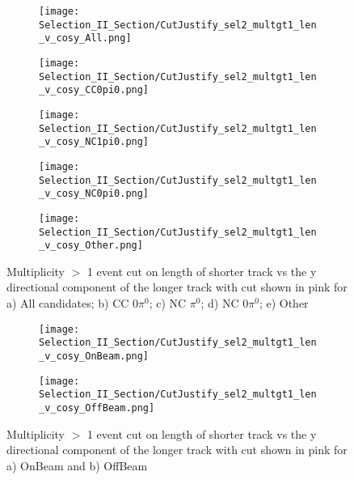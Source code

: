 \begin{figure}[H]
\centering
  \begin{subfigure}[t]{0.36\textwidth}
    \centering
\texttt{[image: Selection\_II\_Section/CutJustify\_sel2\_multgt1\_len\_v\_cosy\_All.png]}
  \caption{ }
  \end{subfigure} 
  \hspace{10 mm}
  \begin{subfigure}[t]{0.36\textwidth}
    \centering
\texttt{[image: Selection\_II\_Section/CutJustify\_sel2\_multgt1\_len\_v\_cosy\_CC0pi0.png]}
  \caption{ }
  \end{subfigure} 
  \hspace{5 mm}
  \begin{subfigure}[t]{0.36\textwidth}
    \centering
\texttt{[image: Selection\_II\_Section/CutJustify\_sel2\_multgt1\_len\_v\_cosy\_NC1pi0.png]}
  \caption{ }
  \end{subfigure} 
  \hspace{10 mm}
  \begin{subfigure}[t]{0.36\textwidth}
    \centering
\texttt{[image: Selection\_II\_Section/CutJustify\_sel2\_multgt1\_len\_v\_cosy\_NC0pi0.png]}  \caption{ }
  \end{subfigure} 
  \hspace{5 mm}
  \begin{subfigure}[t]{0.36\textwidth}
    \centering
\texttt{[image: Selection\_II\_Section/CutJustify\_sel2\_multgt1\_len\_v\_cosy\_Other.png]}
 \caption{ }
  \end{subfigure} 
\caption{ Multiplicity $>$ 1 event cut on length of shorter track vs the y directional component of the longer track with cut shown in pink for a) All candidates; b) CC 0$\pi^0$; c) NC $\pi^0$; d) NC 0$\pi^0$; e) Other }
\label{fig:cutjust_sel2_multgt1_len_v_cosy}
\end{figure}

\begin{figure}[H]
\centering
  \begin{subfigure}[t]{0.36\textwidth}
    \centering
\texttt{[image: Selection\_II\_Section/CutJustify\_sel2\_multgt1\_len\_v\_cosy\_OnBeam.png]}
 \caption{ }
  \end{subfigure} 
  \hspace{10mm}
  \begin{subfigure}[t]{0.36\textwidth}
    \centering
  \texttt{[image: Selection\_II\_Section/CutJustify\_sel2\_multgt1\_len\_v\_cosy\_OffBeam.png]}
   \caption{ }
  \end{subfigure} 
\caption{ Multiplicity $>$ 1 event cut on length of shorter track vs the y directional component of the longer track with cut shown in pink for a) OnBeam and b) OffBeam }
\label{fig:cutjust_sel2_onbeam_multgt1_len_v_cosy}
\end{figure}

